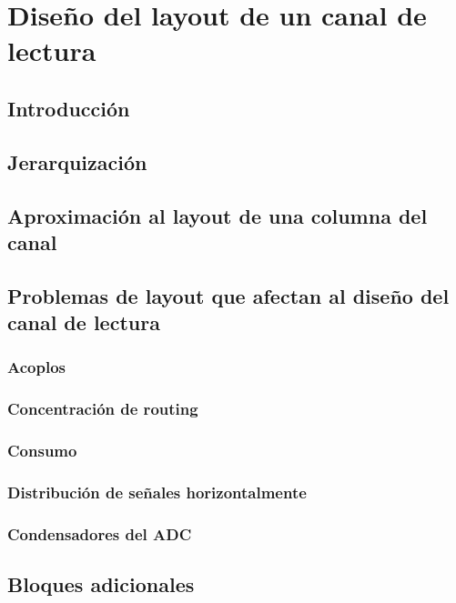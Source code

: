 \chapter{Diseño del layout de un canal de lectura}

\section{Introducción}

\section{Jerarquización}

\section{Aproximación al layout de una columna del canal}

\section{Problemas de layout que afectan al diseño del canal de lectura}

\subsection{Acoplos}

\subsection{Concentración de routing}

\subsection{Consumo}

\subsection{Distribución de señales horizontalmente}

\subsection{Condensadores del ADC}

\section{Bloques adicionales}

